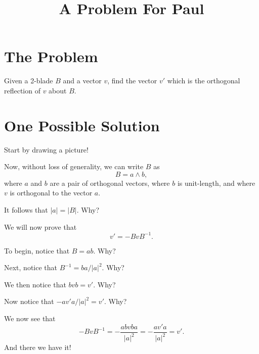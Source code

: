 \documentclass{article}
\title{A Problem For Paul}
\begin{document}
\maketitle

\section*{The Problem}

Given a 2-blade $B$ and a vector $v$, find the vector $v'$ which is the orthogonal
reflection of $v$ about $B$.

\section*{One Possible Solution}

Start by drawing a picture!

Now, without loss of generality, we can write $B$ as
\begin{equation*}
B = a\wedge b,
\end{equation*}
where $a$ and $b$ are a pair of orthogonal vectors, where $b$ is unit-length, and where $v$ is orthogonal to the vector $a$.

It follows that $|a|=|B|$.  Why?

We will now prove that
\begin{equation*}
v' = -BvB^{-1}.
\end{equation*}

To begin, notice that $B = ab$.  Why?

Next, notice that $B^{-1}=ba/|a|^2$.  Why?

We then notice that $bvb = v'$.  Why?

Now notice that $-av'a/|a|^2=v'$.  Why?

We now see that
\begin{equation*}
-BvB^{-1} = -\frac{abvba}{|a|^2} = -\frac{av'a}{|a|^2} = v'.
\end{equation*}
And there we have it!
\end{document}
